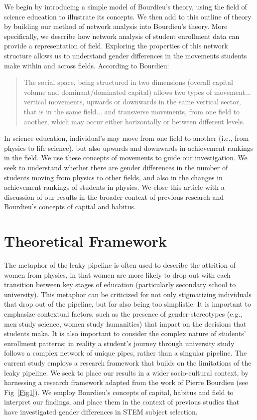 We begin by introducing a simple model of Bourdieu's theory, using the field of science education to illustrate its concepts. We then add to this outline of theory by building our method of network analysis into Bourdieu's theory. More specifically, we describe how network analysis of student enrollment data can provide a representation of field. Exploring the properties of this network structure allows us to understand gender differences in the movements students make within and across fields. According to Bourdieu\cite{Bourdieu1984}: 
\begin{quote}
    The social space, being structured in two dimensions (overall capital volume and dominant/dominated capital) allows two types of movement... vertical movements, upwards or downwards in the same vertical sector, that is in the same field... and transverse movements, from one field to another, which may occur either horizontally or between different levels.
\end{quote} In science education, individual's may move from one field to another (i.e., from physics to life science), but also upwards and downwards in achievement rankings in the field. We use these concepts of movements to guide our investigation. We seek to understand whether there are gender differences in the number of students moving from physics to other fields, and also in the changes in achievement rankings of students in physics. We close this article with a discussion of our results in the broader context of previous research and Bourdieu's concepts of capital and habitus. 

\section*{Theoretical Framework}
The metaphor of the leaky pipeline is often used to describe the attrition of women from physics\cite{Huyer2007, Schiebinger_2001}, in that women are more likely to drop out with each transition between key stages of education (particularly secondary school to university). This metaphor can be criticized for not only stigmatizing individuals that drop out of the pipeline, but for also being too simplistic.\cite{Cannady2014} It is important to emphasize contextual factors, such as the presence of gender-stereotypes\cite{Nosek_2009} (e.g., men study science, women study humanities) that impact on the decisions that students make. It is also important to consider the complex nature of students' enrollment patterns; in reality a student's journey through university study follows a complex network of unique pipes, rather than a singular pipeline. The current study employs a research framework that builds on the limitations of the leaky pipeline. We seek to place our results in a wider socio-cultural context, by harnessing a research framework adapted from the work of Pierre Bourdieu\cite{Bourdieu1984} (see Fig~\ref{Fig1}). We employ Bourdieu's concepts of capital, habitus and field to interpret our findings, and place them in the context of previous studies that have investigated gender differences in STEM subject selection. 

